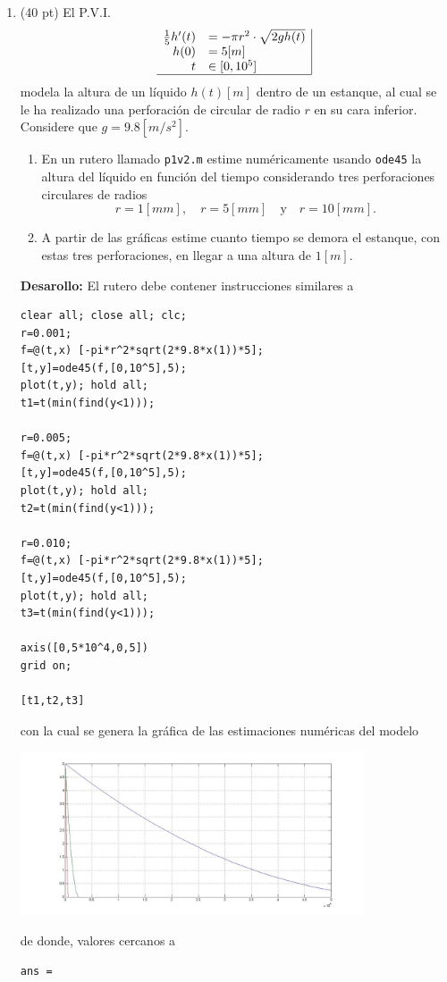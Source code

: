 \documentclass[11pt]{article}
\begin{document}
\begin{enumerate}
\item (40 pt) El P.V.I.
$$
\begin{array}{rl|}
\frac{1}{5}h'(t)	&= -\pi r^2\cdot \sqrt{2 g h(t)}\\
h(0)	&= 5[m] \\ 
t	&\in[0,10^5] \\\hline
\end{array}
$$
modela la altura de un l\'iquido $h(t)[m]$ dentro de un estanque, al cual se le ha realizado una perforaci\'on de circular de radio $r$ en su cara inferior. Considere que $g=9.8[m/s^2]$.

\begin{enumerate}
	\item En un rutero llamado \texttt{p1v2.m} estime num\'ericamente usando \texttt{ode45} la altura del l\'iquido en funci\'on del tiempo considerando tres perforaciones circulares de radios
$$
r=1[mm],\quad  r=5[mm]\quad \text{y}\quad r=10[mm].
$$
	\item A partir de las gr\'aficas estime cuanto tiempo se demora el estanque, con estas tres perforaciones, en llegar a una altura de $1[m]$. 
    
\end{enumerate}
	
\textbf{Desarollo:} 
El rutero debe contener instrucciones similares a
\begin{lstlisting}
clear all; close all; clc;
r=0.001;
f=@(t,x) [-pi*r^2*sqrt(2*9.8*x(1))*5];
[t,y]=ode45(f,[0,10^5],5);
plot(t,y); hold all;
t1=t(min(find(y<1)));

r=0.005;
f=@(t,x) [-pi*r^2*sqrt(2*9.8*x(1))*5];
[t,y]=ode45(f,[0,10^5],5);
plot(t,y); hold all;
t2=t(min(find(y<1)));

r=0.010;
f=@(t,x) [-pi*r^2*sqrt(2*9.8*x(1))*5];
[t,y]=ode45(f,[0,10^5],5);
plot(t,y); hold all;
t3=t(min(find(y<1)));

axis([0,5*10^4,0,5])
grid on;

[t1,t2,t3]
\end{lstlisting}
con la cual se genera la gráfica de las estimaciones num\'ericas del modelo
\begin{center}
\includegraphics[width=0.8\textwidth]{./p1v2.jpg}
\end{center}
de donde, valores cercanos a 
\begin{lstlisting}
ans =


\end{lstlisting}
\end{enumerate}
\end{document}
